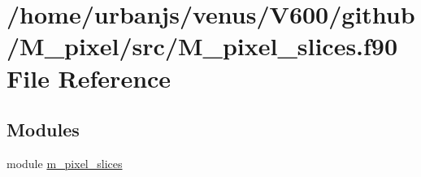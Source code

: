 \hypertarget{M__pixel__slices_8f90}{}\section{/home/urbanjs/venus/\+V600/github/\+M\+\_\+pixel/src/\+M\+\_\+pixel\+\_\+slices.f90 File Reference}
\label{M__pixel__slices_8f90}
\subsection*{Modules}
\begin{DoxyCompactItemize}
\item 
module \mbox{\hyperlink{namespacem__pixel__slices}{m\+\_\+pixel\+\_\+slices}}
\end{DoxyCompactItemize}
